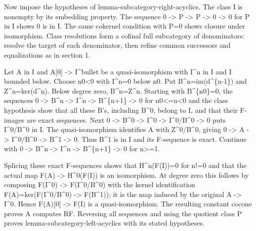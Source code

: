 Now impose the hypotheses of lemma-subcategory-right-acyclics. The class I is nonempty by its embedding property. The sequence 0 \allowbreak{}-> P \allowbreak{}-> P \allowbreak{}-> 0 \allowbreak{}-> 0 for P in I shows 0 is in I. The same cokernel condition with P\allowbreak{}=0 shows closure under isomorphism. Class resolutions form a cofinal full subcategory of denominators:\allowbreak{} resolve the target of each denominator,\allowbreak{} then refine common successors and equalizations as in section 1.

Let A in I and A[0]\allowbreak{} \allowbreak{}-> I\^{}bullet be a quasi-isomorphism with I\^{}n in I and I bounded below. Choose n0\textless0 with I\textasciicircum{}n\allowbreak{}=0 below n0. Put B\textasciicircum{}n\allowbreak{}=im(d\textasciicircum{}\{n-1\})\allowbreak{} and Z\textasciicircum{}n\allowbreak{}=ker(d\textasciicircum{}n)\allowbreak{}. Below degree zero,\allowbreak{} B\textasciicircum{}n\allowbreak{}=Z\textasciicircum{}n. Starting with B\textasciicircum{}\{n0\}\allowbreak{}=0,\allowbreak{} the sequences 0 \allowbreak{}-> B\^{}n \allowbreak{}-> I\^{}n \allowbreak{}-> B\textasciicircum{}\{n\allowbreak{}+1\} \allowbreak{}-> 0 for n0<\allowbreak{}=n<0 and the class hypothesis show that all these B's,\allowbreak{} including B\textasciicircum{}0,\allowbreak{} belong to I,\allowbreak{} and that their F-images are exact sequences. Next 0 \allowbreak{}-> B\^{}0 \allowbreak{}-> I\^{}0 \allowbreak{}-> I\textasciicircum{}0/\allowbreak{}B\textasciicircum{}0 \allowbreak{}-> 0 puts I\textasciicircum{}0/\allowbreak{}B\textasciicircum{}0 in I. The quasi-isomorphism identifies A with Z\textasciicircum{}0/\allowbreak{}B\textasciicircum{}0,\allowbreak{} giving 0 \allowbreak{}-> A \allowbreak{}-> I\textasciicircum{}0/\allowbreak{}B\textasciicircum{}0 \allowbreak{}-> B\^{}1 \allowbreak{}-> 0. Thus B\^{}1 is in I and its F-sequence is exact. Continue with 0 \allowbreak{}-> B\^{}n \allowbreak{}-> I\^{}n \allowbreak{}-> B\textasciicircum{}\{n\allowbreak{}+1\} \allowbreak{}-> 0 for n>\allowbreak{}=1.

Splicing these exact F-sequences shows that H\textasciicircum{}n(F(I)\allowbreak{})\allowbreak{}\allowbreak{}=0 for n!\allowbreak{}=0 and that the actual map F(A)\allowbreak{} \allowbreak{}-> H\textasciicircum{}0(F(I)\allowbreak{})\allowbreak{} is an isomorphism. At degree zero this follows by composing F(I\textasciicircum{}0)\allowbreak{} \allowbreak{}-> F(I\textasciicircum{}0/\allowbreak{}B\textasciicircum{}0)\allowbreak{} with the kernel identification F(A)\allowbreak{}\allowbreak{}=ker(F(I\textasciicircum{}0/\allowbreak{}B\textasciicircum{}0)\allowbreak{} \allowbreak{}-> F(B\textasciicircum{}1)\allowbreak{})\allowbreak{}; it is the map induced by the original A \allowbreak{}-> I\^{}0. Hence F(A)\allowbreak{}[0]\allowbreak{} \allowbreak{}-> F(I)\allowbreak{} is a quasi-isomorphism. The resulting constant cocone proves A computes RF. Reversing all sequences and using the quotient class P proves lemma-subcategory-left-acyclics with its stated hypotheses.

